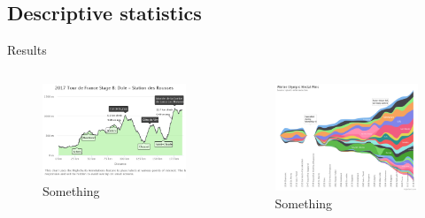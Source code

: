 \documentclass[xcolor=table]{beamer}
\begin{document}
\subsection{Descriptive statistics}
\begin{frame}{Results}
    \begin{columns}
        \begin{column}{0.48\textwidth}
        \begin{figure}
        \includegraphics[scale=0.14]{image4.png}
        \caption{Something}
        \end{figure}
        \end{column}
        \begin{column}{0.48\textwidth}
        \begin{figure}
        \includegraphics[scale=0.094]{image5.png}
        \caption{Something}
        \end{figure}
        \end{column}
        \end{columns}

\end{frame}
\end{document}

